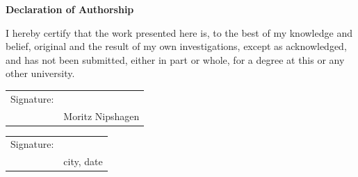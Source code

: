 \documentclass[fontsize=12pt]{scrartcl}
\begin{document}
\pagebreak

\vspace{3.5cm}

\hspace*{\fill}\textbf{\Large Declaration of Authorship}\hspace*{\fill}

\vspace{1.5cm}

I hereby certify that the work presented here is, to the best of my knowledge and belief, original and the result of my own investigations, except as acknowledged, and has not been submitted, either in part or whole, for a degree at this or any other university.

\vspace{1.5cm}

\begin{tabular}{p{}p{}}
	Signature: & \hrulefill \\
	& Moritz Nipshagen
\end{tabular}

\vspace{1.5cm}

\begin{tabular}{p{}p{}}
	Signature: & \hrulefill \\
	& city, date
\end{tabular}
\end{document}
